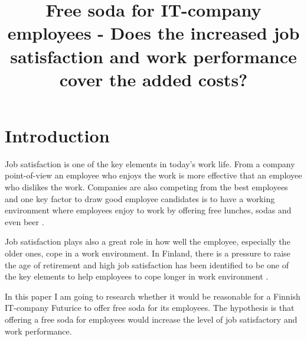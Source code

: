 \documentclass[a4paper]{article}
\begin{document}
\title{\huge Free soda for IT-company employees - Does the increased job satisfaction and work performance cover the added costs?}
\date{\vspace{-5ex}}
\maketitle

\normalsize

\begin{comment}
\title{\huge Free soda for IT-company employees}
\date{2.1.2013}
\author{Mikko Koski \\ mikko.koski@aalto.fi}
\maketitle
\end{comment}

\section{Introduction}

\begin{comment}
Why is this research important? 
Is there a bigger phenomenon that this research of yours is part of? 
Why people in your profession should care about this thesis?
\end{comment}

Job satisfaction is one of the key elements in today's work life. From a company point-of-view an employee who enjoys the work is more effective that an employee who dislikes the work. Companies are also competing from the best employees and one key factor to draw good employee candidates is to have a working environment where employees enjoy to work by offering free lunches, sodas and even beer \citep{huffington}.

Job satisfaction plays also a great role in how well the employee, especially the older ones, cope in a work environment. In Finland, there is a pressure to raise the age of retirement and high job satisfaction has been identified to be one of the key elements to help employees to cope longer in work environment \citep{ek}.

In this paper I am going to research whether it would be reasonable for a Finnish IT-company Futurice to offer free soda for its employees. The hypothesis is that offering a free soda for employees would increase the level of job satisfactory and work performance. 
\end{document}
